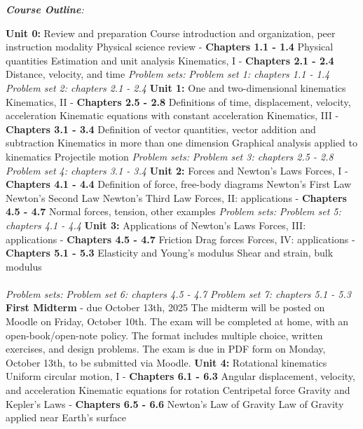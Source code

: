 \documentclass[10pt]{article}
\begin{document}
\clearpage
\twocolumn
\noindent
\textit{\textbf{Course Outline}:}
\begin{outline}[enumerate]
\1 \textbf{Unit 0:} Review and preparation 
\2 Course introduction and organization, peer instruction modality
\2 Physical science review - \textbf{Chapters 1.1 - 1.4}
\3 Physical quantities
\3 Estimation and unit analysis
\2 Kinematics, I - \textbf{Chapters 2.1 - 2.4}
\3 Distance, velocity, and time
\2 \textit{Problem sets:}
\3 \textit{Problem set 1: chapters 1.1 - 1.4}
\3 \textit{Problem set 2: chapters 2.1 - 2.4}
\1 \textbf{Unit 1:} One and two-dimensional kinematics
\2 Kinematics, II - \textbf{Chapters 2.5 - 2.8}
\3 Definitions of time, displacement, velocity, acceleration
\3 Kinematic equations with constant acceleration
\2 Kinematics, III - \textbf{Chapters 3.1 - 3.4}
\3 Definition of vector quantities, vector addition and subtraction
\3 Kinematics in more than one dimension
\3 Graphical analysis applied to kinematics
\3 Projectile motion
\2 \textit{Problem sets:}
\3 \textit{Problem set 3: chapters 2.5 - 2.8}
\3 \textit{Problem set 4: chapters 3.1 - 3.4}
\1 \textbf{Unit 2:} Forces and Newton's Laws
\2 Forces, I - \textbf{Chapters 4.1 - 4.4}
\3 Definition of force, free-body diagrams
\3 Newton's First Law
\3 Newton's Second Law
\3 Newton's Third Law
\2 Forces, II: applications - \textbf{Chapters 4.5 - 4.7}
\3 Normal forces, tension, other examples
\2 \textit{Problem sets:}
\3 \textit{Problem set 5: chapters 4.1 - 4.4}
\1 \textbf{Unit 3:} Applications of Newton's Laws
\2 Forces, III: applications - \textbf{Chapters 4.5 - 4.7}
\3 Friction
\3 Drag forces
\2 Forces, IV: applications - \textbf{Chapters 5.1 - 5.3}
\3 Elasticity and Young's modulus
\3 Shear and strain, bulk modulus \\ \\
\2 \textit{Problem sets:}
\3 \textit{Problem set 6: chapters 4.5 - 4.7}
\3 \textit{Problem set 7: chapters 5.1 - 5.3}
\1 \textbf{First Midterm} - due October 13th, 2025
\2 The midterm will be posted on Moodle on Friday, October 10th.
\2 The exam will be completed at home, with an open-book/open-note policy.  The format includes multiple choice, written exercises, and design problems.
\2 The exam is due in PDF form on Monday, October 13th, to be submitted via Moodle.
\1 \textbf{Unit 4:} Rotational kinematics
\2 Uniform circular motion, I - \textbf{Chapters 6.1 - 6.3}
\3 Angular displacement, velocity, and acceleration
\3 Kinematic equations for rotation
\3 Centripetal force
\2 Gravity and Kepler's Laws - \textbf{Chapters 6.5 - 6.6}
\3 Newton's Law of Gravity
\3 Law of Gravity applied near Earth's surface

\end{outline}
\end{document}
